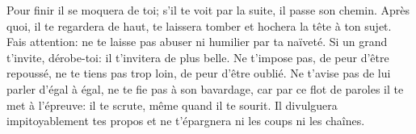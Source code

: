 Pour finir il se moquera de toi;
	s’il te voit par la suite, il passe son chemin.
Après quoi, il te regardera de haut, te laissera tomber et hochera la tête à ton sujet.
	Fais attention: ne te laisse pas abuser ni humilier par ta naïveté.
Si un grand t’invite, dérobe-toi: il t’invitera de plus belle.
Ne t’impose pas, de peur d’être repoussé,
	ne te tiens pas trop loin, de peur d’être oublié.
Ne t’avise pas de lui parler d’égal à égal, ne te fie pas à son bavardage,
	car par ce flot de paroles il te met à l’épreuve:
	il te scrute, même quand il te sourit.
Il divulguera impitoyablement tes propos
	et ne t’épargnera ni les coups ni les chaînes.
